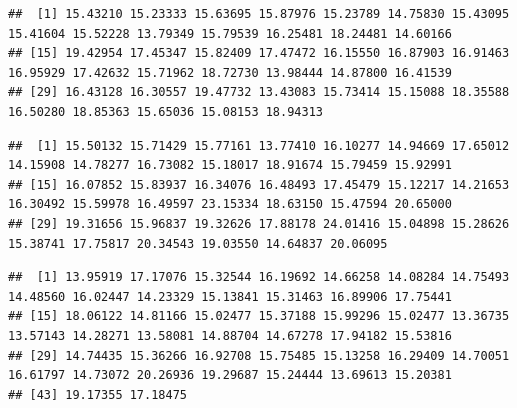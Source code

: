 \documentclass[
  12pt,
]{book}
\newenvironment{Shaded}{\begin{snugshade}}{\end{snugshade}}
\newcommand{\DecValTok}[1]{\textcolor[rgb]{0.00,0.00,0.81}{#1}}
\newcommand{\DocumentationTok}[1]{\textcolor[rgb]{0.56,0.35,0.01}{\textbf{\textit{#1}}}}
\newcommand{\NormalTok}[1]{#1}
\newcommand{\SpecialCharTok}[1]{\textcolor[rgb]{0.00,0.00,0.00}{#1}}
\begin{document}
\begin{verbatim}
##  [1] 15.43210 15.23333 15.63695 15.87976 15.23789 14.75830 15.43095 15.41604 15.52228 13.79349 15.79539 16.25481 18.24481 14.60166
## [15] 19.42954 17.45347 15.82409 17.47472 16.15550 16.87903 16.91463 16.95929 17.42632 15.71962 18.72730 13.98444 14.87800 16.41539
## [29] 16.43128 16.30557 19.47732 13.43083 15.73414 15.15088 18.35588 16.50280 18.85363 15.65036 15.08153 18.94313
\end{verbatim}

\begin{Shaded}
\end{Shaded}

\begin{verbatim}
##  [1] 15.50132 15.71429 15.77161 13.77410 16.10277 14.94669 17.65012 14.15908 14.78277 16.73082 15.18017 18.91674 15.79459 15.92991
## [15] 16.07852 15.83937 16.34076 16.48493 17.45479 15.12217 14.21653 16.30492 15.59978 16.49597 23.15334 18.63150 15.47594 20.65000
## [29] 19.31656 15.96837 19.32626 17.88178 24.01416 15.04898 15.28626 15.38741 17.75817 20.34543 19.03550 14.64837 20.06095
\end{verbatim}

\begin{Shaded}
\end{Shaded}

\begin{verbatim}
##  [1] 13.95919 17.17076 15.32544 16.19692 14.66258 14.08284 14.75493 14.48560 16.02447 14.23329 15.13841 15.31463 16.89906 17.75441
## [15] 18.06122 14.81166 15.02477 15.37188 15.99296 15.02477 13.36735 13.57143 14.28271 13.58081 14.88704 14.67278 17.94182 15.53816
## [29] 14.74435 15.36266 16.92708 15.75485 15.13258 16.29409 14.70051 16.61797 14.73072 20.26936 19.29687 15.24444 13.69613 15.20381
## [43] 19.17355 17.18475
\end{verbatim}
\end{document}
